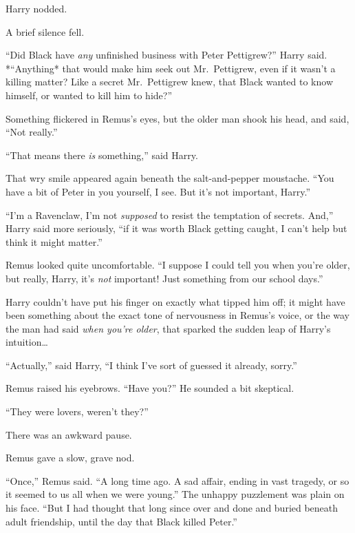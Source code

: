 Harry nodded.

A brief silence fell.

``Did Black have \emph{any} unfinished business with Peter Pettigrew?''
Harry said. *``Anything* that would make him seek out Mr.~Pettigrew,
even if it wasn't a killing matter? Like a secret Mr.~Pettigrew knew,
that Black wanted to know himself, or wanted to kill him to hide?''

Something flickered in Remus's eyes, but the older man shook his head,
and said, ``Not really.''

``That means there \emph{is} something,'' said Harry.

That wry smile appeared again beneath the salt-and-pepper moustache.
``You have a bit of Peter in you yourself, I see. But it's not
important, Harry.''

``I'm a Ravenclaw, I'm not \emph{supposed} to resist the temptation of
secrets. And,'' Harry said more seriously, ``if it was worth Black
getting caught, I can't help but think it might matter.''

Remus looked quite uncomfortable. ``I suppose I could tell you when
you're older, but really, Harry, it's \emph{not} important! Just
something from our school days.''

Harry couldn't have put his finger on exactly what tipped him off; it
might have been something about the exact tone of nervousness in Remus's
voice, or the way the man had said \emph{when you're older}, that
sparked the sudden leap of Harry's intuition\ldots{}

``Actually,'' said Harry, ``I think I've sort of guessed it already,
sorry.''

Remus raised his eyebrows. ``Have you?'' He sounded a bit skeptical.

``They were lovers, weren't they?''

There was an awkward pause.

Remus gave a slow, grave nod.

``Once,'' Remus said. ``A long time ago. A sad affair, ending in vast
tragedy, or so it seemed to us all when we were young.'' The unhappy
puzzlement was plain on his face. ``But I had thought that long since
over and done and buried beneath adult friendship, until the day that
Black killed Peter.''
